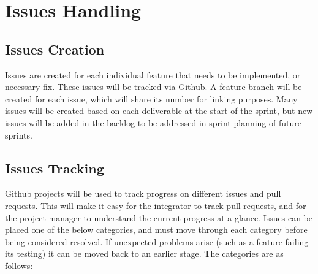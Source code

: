\section{Issues Handling} \label{section: issues handling}

\subsection{Issues Creation}

Issues are created for each individual feature that needs to be implemented, or necessary fix.
These issues will be tracked via Github.
A feature branch will be created for each issue, which will share its number for linking purposes.
Many issues will be created based on each deliverable at the start of the sprint, but new issues will be added in the backlog to be addressed in sprint planning of future sprints.

\subsection{Issues Tracking}

Github projects will be used to track progress on different issues and pull requests. This will make it easy for the integrator to track pull requests, and for the project manager to understand the current progress at a glance. Issues can be placed one of the below categories, and must move through each category before being considered resolved. If unexpected problems arise (such as a feature failing its testing) it can be moved back to an earlier stage. The categories are as follows:

